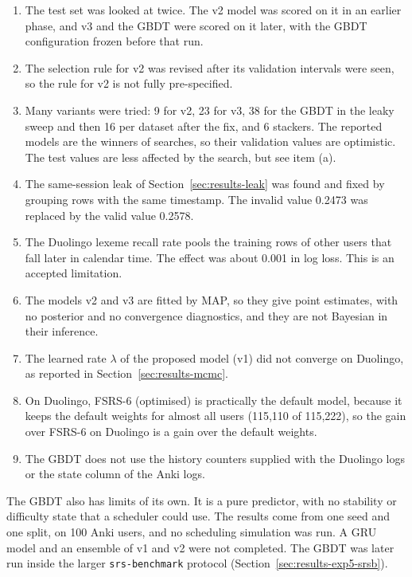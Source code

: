 \begin{enumerate}[label=(\alph*)]
  \item The test set was looked at twice. The v2 model was scored on it in an earlier phase, and v3 and the GBDT were scored on it later, with the GBDT configuration frozen before that run.
  \item The selection rule for v2 was revised after its validation intervals were seen, so the rule for v2 is not fully pre-specified.
  \item Many variants were tried: 9 for v2, 23 for v3, 38 for the GBDT in the leaky sweep and then 16 per dataset after the fix, and 6 stackers. The reported models are the winners
    of searches, so their validation values are optimistic. The test values are less affected by the search, but see item (a).
  \item The same-session leak of Section~\ref{sec:results-leak} was found and fixed by grouping rows with the same timestamp. The invalid value 0.2473 was replaced by the valid value 0.2578.
  \item The Duolingo lexeme recall rate pools the training rows of other users that fall later in calendar time. The effect was about 0.001 in log loss. This is an accepted limitation.
  \item The models v2 and v3 are fitted by MAP, so they give point estimates, with no posterior and no convergence diagnostics, and they are not Bayesian in their inference.
  \item The learned rate $\lambda$ of the proposed model (v1) did not converge on Duolingo, as reported in Section~\ref{sec:results-mcmc}.
  \item On Duolingo, FSRS-6 (optimised) is practically the default model, because it keeps the default weights for almost all users (115,110 of 115,222), so the gain over FSRS-6 on Duolingo is a gain over the default weights.
  \item The GBDT does not use the history counters supplied with the Duolingo logs or the state column of the Anki logs.
\end{enumerate}

The GBDT also has limits of its own. It is a pure predictor, with no stability or difficulty state that a scheduler could use. The results come from one seed and one split, on 100 Anki users, and no scheduling simulation was run.
A GRU model and an ensemble of v1 and v2 were not completed. The GBDT was later run inside the larger \texttt{srs-benchmark} protocol (Section~\ref{sec:results-exp5-srsb}).

